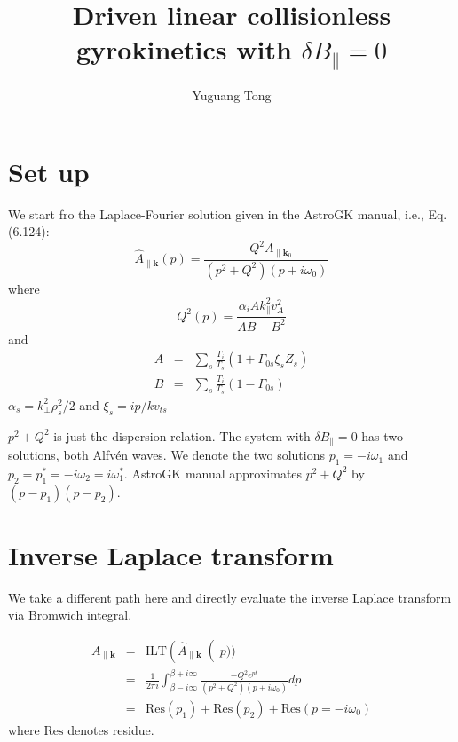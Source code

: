 \documentclass[11pt, oneside]{article}   	%
\title{Driven linear collisionless gyrokinetics with  $\delta B_\parallel = 0$}
\author{Yuguang Tong}
\begin{document}
\newcommand{\vect}[1]{\mathbf{#1}}

\maketitle
\section{Set up}
We start fro the Laplace-Fourier solution given in the AstroGK manual, i.e., Eq. (6.124):
%
\begin{equation}
\hat{A}_{\parallel \vect{k}}(p) = \frac{-Q^2 A_{\parallel \vect{k}_0}}{\left(p^2 + Q^2 \right) (p + i\omega_0)}
\end{equation}
where
%
\begin{equation}
Q^2(p) = \frac{\alpha_i A k_\parallel^2 v_A^2}{AB-B^2}
\end{equation}
and 
%
\begin{eqnarray}
A &=& \sum_s \frac{T_i}{T_s} (1 + \Gamma_{0s} \xi_s Z_s) \\
B &=& \sum_s \frac{T_i}{T_s} ( 1 - \Gamma_{0s})
\end{eqnarray}
$\alpha_s = k_\perp^2 \rho_s^2 / 2$ and $\xi_s = ip/kv_{ts}$

$p^2 + Q^2$ is just the dispersion relation. The system with $\delta B_\parallel = 0$ has two solutions, both Alfv{\'e}n waves. We denote the two solutions $p_1 = -i\omega_1$ and $p_2 = p_1^* = -i \omega_2 = i \omega_1^*$. AstroGK manual approximates $p^2 + Q^2$ by $(p-p_1)(p-p_2)$. 

\section{Inverse Laplace transform}
We take a different path here and directly evaluate the inverse Laplace transform via Bromwich integral. 

%
\begin{eqnarray}
A_{\parallel\vect{k}} &=& \mathrm{ILT}\left(\hat{A}_{\parallel \vect{k}}\right (p)) \\
&=& \frac{1}{2\pi i} \int_{\beta-i\infty}^{\beta + i \infty} \frac{-Q^2 e^{pt}}{(p^2+Q^2)(p+i\omega_0)} dp \\
&=& \mathrm{Res}(p_1) + \mathrm{Res}(p_2) + \mathrm{Res}(p = - i\omega_0) 
\end{eqnarray}
where $\mathrm{Res}$ denotes residue.
\end{document}
